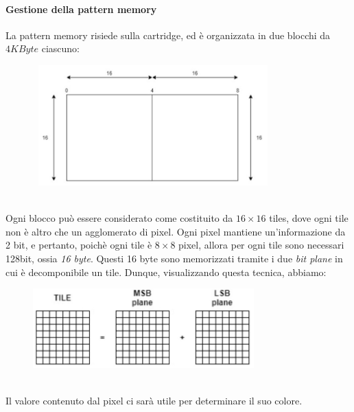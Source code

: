 \documentclass[11pt]{article}
\begin{document}
\paragraph{Gestione della pattern memory} La pattern memory risiede sulla cartridge, ed è organizzata in due blocchi da $4KByte$ ciascuno:
\begin{figure}[h]
\centering
\includegraphics[width=350px, height=175px]{PATTERNMEM.jpg}
\end{figure}\\
Ogni blocco può essere considerato come costituito da $16\times16$ tiles, dove ogni tile non è altro che un agglomerato di pixel. Ogni pixel mantiene un'informazione da 2 bit, e pertanto, poichè ogni tile è $8\times8$ pixel, allora per ogni tile sono necessari 128bit, ossia \emph{16 byte}. Questi 16 byte sono memorizzati tramite i due \emph{bit plane} in cui è decomponibile un tile. Dunque, visualizzando questa tecnica, abbiamo:
\begin{figure}[h]
\centering
\includegraphics[width=322px, height=116px]{TILE_STORING.jpg}
\end{figure}\\
Il valore contenuto dal pixel ci sarà utile per determinare il suo colore.
\clearpage
\end{document}
